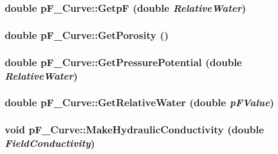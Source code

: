 \hypertarget{classp_f___curve_a6989350998b7c15af4fd59055ee20676}{
\subsubsection[{GetpF}]{\setlength{\rightskip}{0pt plus 5cm}double pF\_\-Curve::GetpF (double {\em RelativeWater})}}
\label{classp_f___curve_a6989350998b7c15af4fd59055ee20676}
\hypertarget{classp_f___curve_a56e32b11b9053c1b91ac9610c38a3822}{
\subsubsection[{GetPorosity}]{\setlength{\rightskip}{0pt plus 5cm}double pF\_\-Curve::GetPorosity ()}}
\label{classp_f___curve_a56e32b11b9053c1b91ac9610c38a3822}
\hypertarget{classp_f___curve_a816b70830f88edec58e42d94dee0b254}{
\subsubsection[{GetPressurePotential}]{\setlength{\rightskip}{0pt plus 5cm}double pF\_\-Curve::GetPressurePotential (double {\em RelativeWater})}}
\label{classp_f___curve_a816b70830f88edec58e42d94dee0b254}
\hypertarget{classp_f___curve_a662cff8287e3a413961df635acef65b7}{
\subsubsection[{GetRelativeWater}]{\setlength{\rightskip}{0pt plus 5cm}double pF\_\-Curve::GetRelativeWater (double {\em pFValue})}}
\label{classp_f___curve_a662cff8287e3a413961df635acef65b7}
\hypertarget{classp_f___curve_adc14b985f54ce11c4955b319f1428f3e}{
\subsubsection[{MakeHydraulicConductivity}]{\setlength{\rightskip}{0pt plus 5cm}void pF\_\-Curve::MakeHydraulicConductivity (double {\em FieldConductivity})}}
